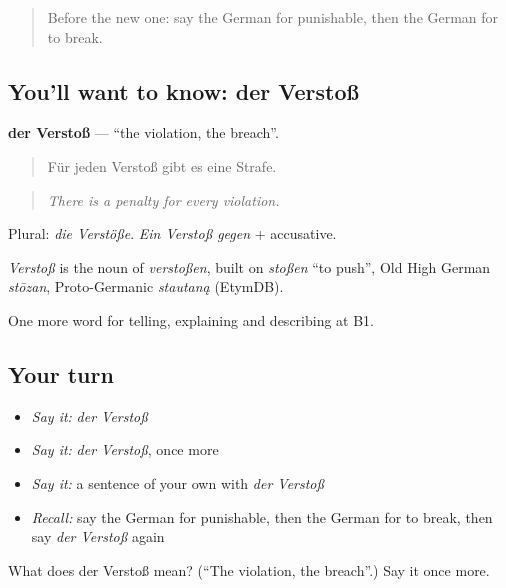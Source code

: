 \label{lesson:GE-C382-verstoss}



\begin{quote}
Before the new one: say the German for punishable, then the German for to break.
\end{quote}

\subsection*{You'll want to know: der Verstoß}
\textbf{der Verstoß} — \textquotedblleft{}the violation, the breach\textquotedblright{}.

\begin{quote}
Für jeden Verstoß gibt es eine Strafe.
\end{quote}

\begin{quote}
\emph{There is a penalty for every violation.}
\end{quote}

Plural: \emph{die Verstöße}. \emph{Ein Verstoß gegen} + accusative.

\begin{cousinweb}
\emph{Verstoß} is the noun of \emph{verstoßen}, built on \emph{stoßen} \textquotedblleft{}to push\textquotedblright{}, Old High German \emph{stōzan}, Proto-Germanic \emph{stautaną} (EtymDB).
\end{cousinweb}

\begin{grammarlens}[title={What you've built}]
One more word for telling, explaining and describing at B1.
\end{grammarlens}

\subsection*{Your turn}
\begin{itemize}
\raggedright
  \item \emph{Say it:} \emph{der Verstoß}
  \item \emph{Say it:} \emph{der Verstoß}, once more
  \item \emph{Say it:} a sentence of your own with \emph{der Verstoß}
  \item \emph{Recall:} say the German for punishable, then the German for to break, then say \emph{der Verstoß} again
\end{itemize}

\begin{tcolorbox}[breakable,colback=teal!4,colframe=teal!35!black,title={Before you move on}]
What does der Verstoß mean? (\textquotedblleft{}The violation, the breach\textquotedblright{}.) Say it once more.
\end{tcolorbox}
